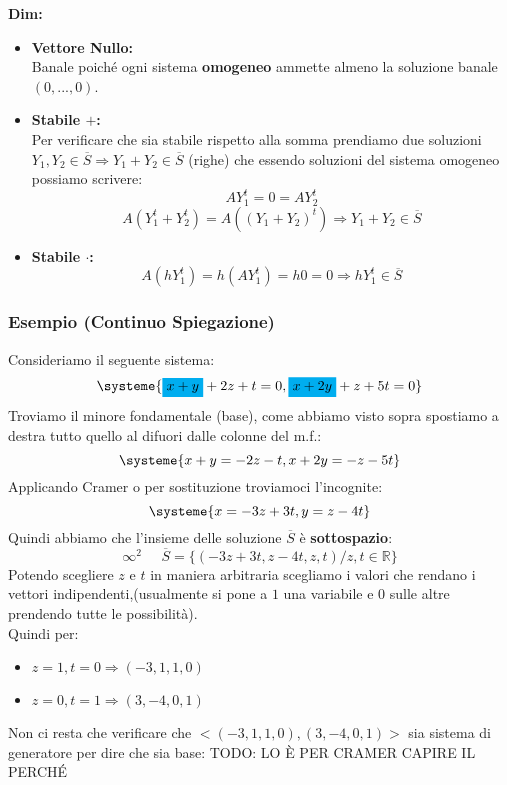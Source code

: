 \textbf{Dim:}
\begin{itemize}

\item[] \textbf{Vettore Nullo:}\\
Banale poiché ogni sistema \textbf{omogeneo} ammette almeno la soluzione banale $(0,...,0)$.

\item[] \textbf{Stabile $+$:}\\
Per verificare che sia stabile rispetto alla somma prendiamo due soluzioni $Y_1,Y_2 \in \overline{S} \Rightarrow Y_1+Y_2 \in \overline{S}$ (righe) che essendo soluzioni del sistema omogeneo possiamo scrivere:
$$AY_1^t = 0 = AY_2^t$$
$$A(Y_1^t+Y_2^t) = A((Y_1+Y_2)^t) \Rightarrow Y_1+Y_2 \in \overline{S} $$
\item[] \textbf{Stabile $\cdot$:}\\
$$ A(hY_1^t) = h(AY_1^t) = h0 = 0 \Rightarrow hY_1^t \in \overline{S} $$
\end{itemize}

\subsubsection{Esempio (Continuo Spiegazione)}
Consideriamo il seguente sistema:
$$ 
\systeme
{
\mathcolorbox{cyan}{x+y}+2z+t=0,
\mathcolorbox{cyan}{x+2y}+z+5t=0
}
$$
Troviamo il minore fondamentale (base), come abbiamo visto sopra spostiamo a destra tutto quello al difuori dalle colonne del m.f.:
$$
\systeme
{
x+y = -2z-t,
x+2y= -z-5t
} 
$$
Applicando Cramer o per sostituzione troviamoci l'incognite:
$$
\systeme
{
x = -3z+3t,
y = z-4t
}
$$
Quindi abbiamo che l'insieme delle soluzione $\overline{S}$ è \textbf{sottospazio}:
$$ \infty^2 \;\;\;\;\; \overline{S}=\{(-3z+3t,z-4t,z,t)/ z,t \in \mathbb{R}\} $$
Potendo scegliere $z$ e $t$ in maniera arbitraria scegliamo i valori che rendano i vettori indipendenti,(usualmente si pone a $1$ una variabile e $0$ sulle altre prendendo tutte le possibilità).\\
Quindi per:
\begin{itemize}
\item[]$z=1,t=0 \Rightarrow (-3,1,1,0)$
\item[]$z=0,t=1 \Rightarrow (3,-4,0,1)$
\end{itemize}
Non ci resta che verificare che $<(-3,1,1,0),(3,-4,0,1)>$ sia sistema di generatore per dire che sia base:
TODO: LO È PER CRAMER CAPIRE IL PERCHÉ

